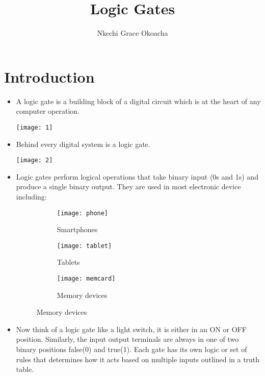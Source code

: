 \documentclass{article}
\begin{document}
	\title{Logic Gates}
	
	\author{Nkechi Grace Okoacha}
	
	\maketitle
	
\tableofcontents
	
\newpage

\section{Introduction}

\label{intro}
	\begin{itemize}
		\item A logic gate is a building block of a digital circuit which is at the heart of any computer operation. \\
		
	\begin{center}
		\texttt{[image: 1]}
	\end{center}
		
		\item Behind every digital system is a logic gate. \\
		
		\begin{center}
			\texttt{[image: 2]}
		\end{center}
		
		\item Logic gates perform logical operations that take binary input (0s and 1s) and produce  a single binary output. They are used in most electronic device including: \\
			\begin{figure}[h!]
				\centering
				\begin{subfigure}[b]{0.2\linewidth}
				\texttt{[image: phone]}
				\caption{Smartphones}
				\end{subfigure}
			\begin{subfigure}[b]{0.2\linewidth}
				\texttt{[image: tablet]}
				\caption{Tablets}
			\end{subfigure}
		\begin{subfigure}[b]{0.2\linewidth}
			\texttt{[image: memcard]}
			\caption{Memory devices}
		\end{subfigure}
			\end{figure} 
		
		\item Now think of a logic gate like a light switch, it is either in an ON or OFF position. Similarly, the input output terminals are always in one of two binary positions false(0) and true(1). Each gate has its own logic or set of rules that determines how it acts based on multiple inputs outlined in a truth table. \\
		

\end{itemize}
\end{document}
